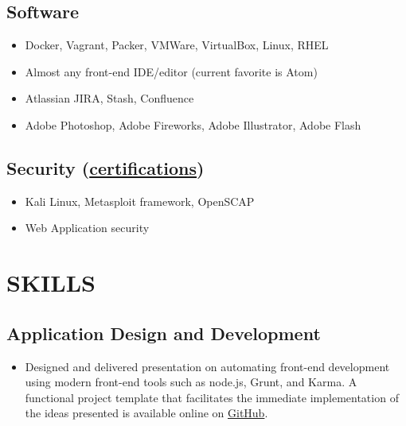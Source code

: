 \documentclass[10pt]{article}
\begin{document}
\subsection{Software}\label{software}

\begin{itemize}
\itemsep1pt\parskip0pt
\item
  Docker, Vagrant, Packer, VMWare, VirtualBox, Linux, RHEL
\item
  Almost any front-end IDE/editor (current favorite is Atom)
\item
  Atlassian JIRA, Stash, Confluence
\item
  Adobe Photoshop, Adobe Fireworks, Adobe Illustrator, Adobe Flash
\end{itemize}

\subsection{\texorpdfstring{Security
(\hyperref[certifications]{certifications})}{Security (certifications)}}\label{security-certifications}

\begin{itemize}
\itemsep1pt\parskip0pt
\item
  Kali Linux, Metasploit framework, OpenSCAP
\item
  Web Application security
\end{itemize}

\section{SKILLS}\label{skills}

\subsection{Application Design and
Development}\label{application-design-and-development}

\begin{itemize}
\itemsep1pt\parskip0pt
\item
  Designed and delivered presentation on automating front-end
  development using modern front-end tools such as node.js, Grunt, and
  Karma. A functional project template that facilitates the immediate
  implementation of the ideas presented is available online on
  \href{https://github.com/jhwohlgemuth/generator-techtonic}{GitHub}.
\end{itemize}
\end{document}

